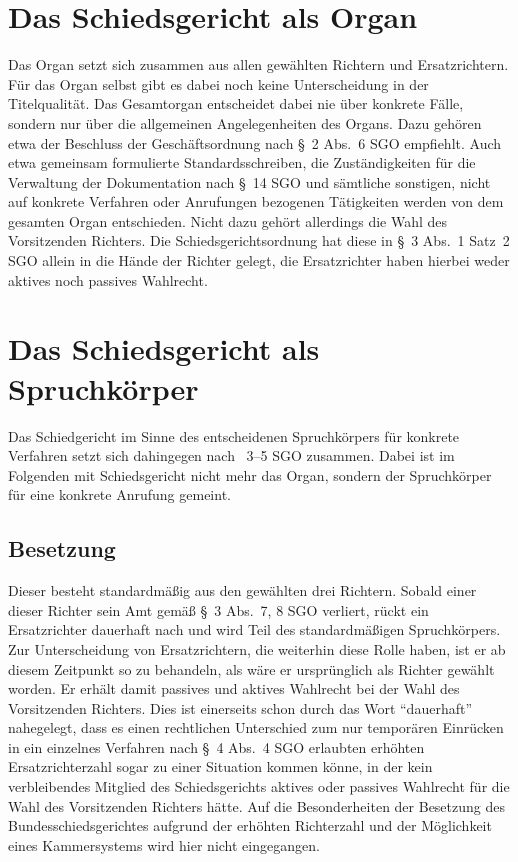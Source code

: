 \section{Das Schiedsgericht als Organ}
\label{Zusammensetzung:Organ}
Das Organ setzt sich zusammen aus allen gewählten Richtern und Ersatzrichtern.
Für das Organ selbst gibt es dabei noch keine Unterscheidung in der Titelqualität.
Das Gesamtorgan entscheidet dabei nie über konkrete Fälle, sondern nur über die allgemeinen Angelegenheiten des Organs.
Dazu gehören etwa der Beschluss der Geschäftsordnung nach \S~2 Abs.~6 SGO empfiehlt.
Auch etwa gemeinsam formulierte Standardsschreiben, die Zuständigkeiten für die Verwaltung der Dokumentation nach \S~14 SGO und sämtliche sonstigen, nicht auf konkrete Verfahren oder Anrufungen bezogenen Tätigkeiten werden von dem gesamten Organ entschieden.
Nicht dazu gehört allerdings die Wahl des Vorsitzenden Richters.
Die Schiedsgerichtsordnung hat diese in \S~3 Abs.~1 Satz~2 SGO allein in die Hände der Richter gelegt, die Ersatzrichter haben hierbei weder aktives noch passives Wahlrecht.

\section{Das Schiedsgericht als Spruchkörper}
\label{Zusammensetzung:Spruchkoerper}
Das Schiedgericht im Sinne des entscheidenen Spruchkörpers für konkrete Verfahren setzt sich dahingegen nach \SSS~3--5 SGO zusammen. Dabei ist im Folgenden mit Schiedsgericht nicht mehr das Organ, sondern der Spruchkörper für eine konkrete Anrufung gemeint.

\subsection{Besetzung}
\label{Zusammensetzung:Spruchkoerper:Besetzung}
Dieser besteht standardmäßig aus den gewählten drei Richtern.
Sobald einer dieser Richter sein Amt gemäß \S~3 Abs.~7, 8 SGO verliert, rückt ein Ersatzrichter dauerhaft nach und wird Teil des standardmäßigen Spruchkörpers.
Zur Unterscheidung von Ersatzrichtern, die weiterhin diese Rolle haben, ist er ab diesem Zeitpunkt so zu behandeln, als wäre er ursprünglich als Richter gewählt worden.
Er erhält damit passives und aktives Wahlrecht bei der Wahl des Vorsitzenden Richters.
Dies ist einerseits schon durch das Wort \enquote{dauerhaft} nahegelegt, dass es einen rechtlichen Unterschied zum nur temporären Einrücken in ein einzelnes Verfahren nach \S~4 Abs.~4 SGO erlaubten erhöhten Ersatzrichterzahl sogar zu einer Situation kommen könne, in der kein verbleibendes Mitglied des Schiedsgerichts aktives oder passives Wahlrecht für die Wahl des Vorsitzenden Richters hätte.
Auf die Besonderheiten der Besetzung des Bundesschiedsgerichtes aufgrund der erhöhten Richterzahl und der Möglichkeit eines Kammersystems wird hier nicht eingegangen.

